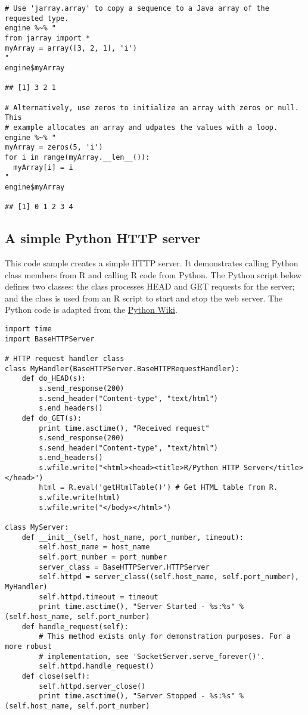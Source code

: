 \begin{verbatim}
# Use 'jarray.array' to copy a sequence to a Java array of the requested type.
engine %~% "
from jarray import *
myArray = array([3, 2, 1], 'i')
"
engine$myArray

## [1] 3 2 1

# Alternatively, use zeros to initialize an array with zeros or null. This
# example allocates an array and udpates the values with a loop.
engine %~% "
myArray = zeros(5, 'i')
for i in range(myArray.__len__()):
  myArray[i] = i
"
engine$myArray

## [1] 0 1 2 3 4
\end{verbatim}

\subsection{A simple Python HTTP server}

This code sample creates a simple HTTP server. It demonstrates calling Python class members from R and calling R code from Python. The Python script below defines two classes: the  class processes HEAD and GET requests for the server; and the  class is used from an R script to start and stop the web server. The Python code is adapted from the \href{https://wiki.python.org/moin/BaseHttpServer}{Python Wiki}.

\begin{verbatim}
import time
import BaseHTTPServer

# HTTP request handler class
class MyHandler(BaseHTTPServer.BaseHTTPRequestHandler):
    def do_HEAD(s):
        s.send_response(200)
        s.send_header("Content-type", "text/html")
        s.end_headers()
    def do_GET(s):
        print time.asctime(), "Received request"
        s.send_response(200)
        s.send_header("Content-type", "text/html")
        s.end_headers()
        s.wfile.write("<html><head><title>R/Python HTTP Server</title></head>")
        html = R.eval('getHtmlTable()') # Get HTML table from R.
        s.wfile.write(html)
        s.wfile.write("</body></html>")

class MyServer:
    def __init__(self, host_name, port_number, timeout):
        self.host_name = host_name
        self.port_number = port_number
        server_class = BaseHTTPServer.HTTPServer
        self.httpd = server_class((self.host_name, self.port_number), MyHandler)
        self.httpd.timeout = timeout
        print time.asctime(), "Server Started - %s:%s" % (self.host_name, self.port_number)
    def handle_request(self):
        # This method exists only for demonstration purposes. For a more robust
        # implementation, see 'SocketServer.serve_forever()'.
        self.httpd.handle_request()
    def close(self):
        self.httpd.server_close()
        print time.asctime(), "Server Stopped - %s:%s" % (self.host_name, self.port_number)
\end{verbatim}

